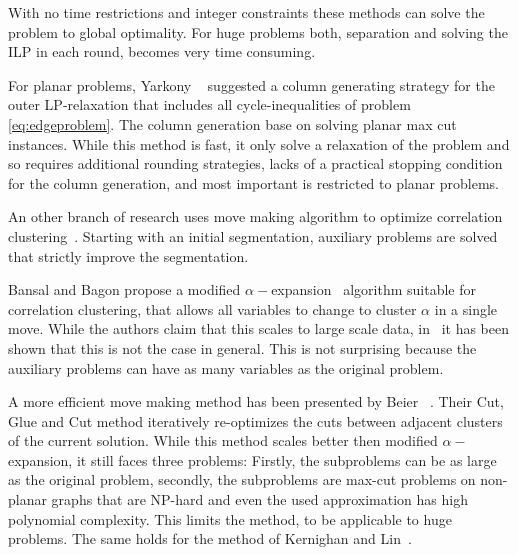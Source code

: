 \documentclass[10pt,twocolumn,letterpaper]{article}
\begin{document}
With no time restrictions and integer constraints these methods can solve the problem to global optimality.
For huge problems both, separation and solving the ILP in each round, becomes very time consuming.

For planar problems, Yarkony \etal~\cite{yarkony_2012_eccv} 
suggested a column generating strategy for the outer LP-relaxation
that includes all cycle-inequalities of problem \ref{eq:edgeproblem}.
The column generation base on solving planar max cut instances.
While this method is fast, 
it only solve a relaxation of the problem and so requires additional rounding strategies,
lacks of a practical stopping condition for the column generation,
and most important  is restricted to planar problems.

An other branch of research uses move making algorithm 
to optimize correlation clustering~\cite{bansal_2004_ml,beier_2014_cvpr,Kernighan-1970}.
Starting with an initial segmentation, auxiliary problems are solved that 
strictly improve the segmentation.

Bansal and Bagon propose a modified $\alpha-$expansion~\cite{bansal_2004_ml} 
algorithm suitable for correlation clustering, that allows all variables to 
change to cluster $\alpha$ in a single move. While the authors claim that this
scales to large scale data, in~\cite{beier_2014_cvpr} it has been shown that 
this is not the case in general. This is not surprising because the auxiliary 
problems can have as many variables as the original problem. 
 
A more efficient move making method has been presented by Beier \etal~\cite{beier_2014_cvpr}.
Their Cut, Glue and Cut method iteratively re-optimizes the cuts between adjacent clusters of the current solution.
While this method scales better then  modified $\alpha-$expansion, it still faces three problems:
Firstly, the subproblems can be as large as the original problem,
secondly, the subproblems are max-cut problems on non-planar graphs that are NP-hard 
and even the used approximation has high polynomial complexity.
This limits the method, to be applicable to huge problems. The same holds for the 
method of Kernighan and Lin~\cite{Kernighan-1970}. 

\end{document}
